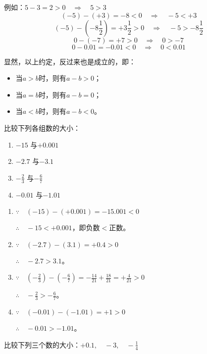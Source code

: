 例如：$5-3=2>0 \quad \Rightarrow\quad 5>3$
\[(-5)-(+3)=-8<0 \quad \Rightarrow\quad -5<+3\]
\[(-5)-\left(-8\frac{1}{2}\right)=+3\frac{1}{2}>0 \quad \Rightarrow\quad -5>-8\frac{1}{2}\]
\[0-(-7)=+7>0 \quad \Rightarrow\quad 0>-7\]
\[0-0.01=-0.01<0 \quad \Rightarrow\quad 0<0.01\]

显然，以上约定，反过来也是成立的，即：
\begin{itemize}
    \item 当$a>b$时，则有$a-b>0$；
    \item     当$a =b$时，则有$a-b=0$；
    \item     当$a<b$时，则有$a-b<0$。
\end{itemize}

\begin{example}
    比较下列各组数的大小：
   \begin{multicols}{2}
\begin{enumerate}
    \item $-15$ 与$+0.001$
    \item $-2.7$ 与$-3.1$
    \item $-\frac{2}{3}$ 与$-\frac{6}{7}$
    \item $-0.01$ 与$-1.01$
\end{enumerate}
   \end{multicols}
\end{example}

\begin{solution}
\begin{enumerate}
    \item $\because\quad (-15)-(+0.001)=-15.001<0$

$\therefore\quad -15<+0.001$，即负数$<$正数。

\item $\because\quad (-2.7)-(3.1)=+0.4>0$

$\therefore\quad -2.7>3.1$。

\item $\because\quad \left(-\frac{2}{3}\right)-\left(-\frac{6}{7}\right)=-\frac{14}{21}+\frac{18}{21}=+\frac{4}{21}>0$

$\therefore\quad -\frac{2}{3}>-\frac{6}{7}$。

\item $\because\quad (-0.01)-(-1.01)=+1>0$

$\therefore\quad -0.01>-1.01$。
\end{enumerate}    
\end{solution}

\begin{example}
比较下列三个数的大小：$+0.1,\quad -3,\quad -\frac{1}{4}$
\end{example}

